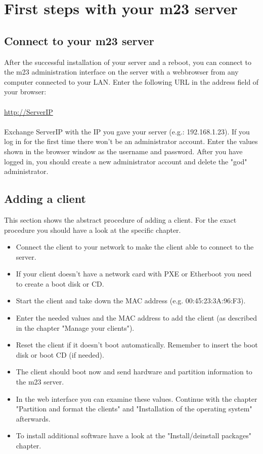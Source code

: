 \chapter{First steps with your m23 server}
\section{Connect to your m23 server}
After the successful installation of your server and a reboot, you can connect to the m23 administration interface on the server with a webbrowser from any computer connected to your LAN. Enter the following URL in the address field of your browser:\\\\
\underline{http://ServerIP}\\\\

Exchange ServerIP with the IP you gave your server (e.g.: 192.168.1.23). If you log in for the first time there won't be an administrator account. Enter the values shown in the browser window as the username and password. After you have logged in, you should create a new administrator account and delete the "god" administrator.

\section{Adding a client}
This section shows the abstract procedure of adding a client. For the exact procedure you should have a look at the specific chapter.

\begin{itemize}
\item Connect the client to your network to make the client able to connect to the server.
\item If your client doesn't have a network card with PXE or Etherboot you need to create a boot disk or CD.
\item Start the client and take down the MAC address (e.g. 00:45:23:3A:96:F3).
\item Enter the needed values and the MAC address to add the client (as described in the chapter "Manage your clients").
\item Reset the client if it doesn't boot automatically. Remember to insert the boot disk or boot CD (if needed).
\item The client should boot now and send hardware and partition information to the m23 server.
\item In the web interface you can examine these values. Continue with the chapter "Partition and format the clients" and "Installation of the operating system" afterwards.
\item To install additional software have a look at the "Install/deinstall packages" chapter.
\end{itemize}
